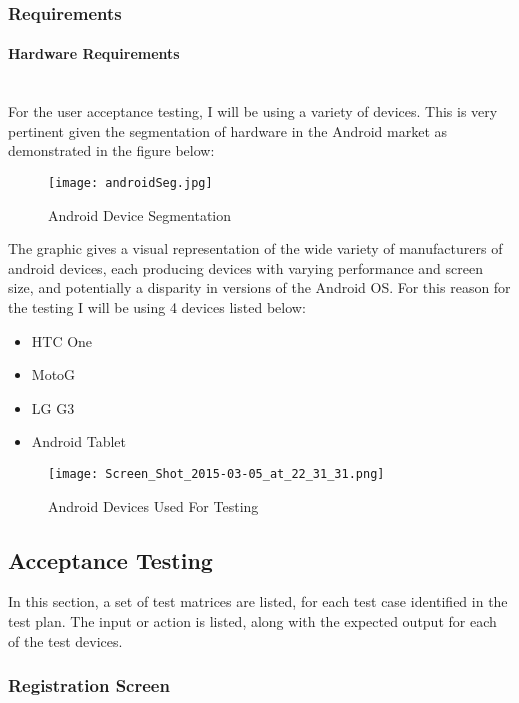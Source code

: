 \documentclass[a4paper]{article}
\newcommand{\subsubsubsection}[1]{\paragraph{#1}\mbox{}\\}
\begin{document}
\subsubsection{Requirements}
\subsubsubsection{Hardware Requirements}
For the user acceptance testing, I will be using a variety of devices. This is very pertinent given the segmentation of hardware in the Android market as demonstrated in the figure below:
\begin{figure}[H]

\centering
\texttt{[image: androidSeg.jpg]}
\caption{Android Device Segmentation}
\end{figure}
The graphic gives a visual representation of the wide variety of manufacturers of android devices, each producing devices with varying performance and screen size, and potentially a disparity in versions of the Android OS.
For this reason for the testing I will be using 4 devices listed below:
\begin{itemize}
\item HTC One
\item MotoG
\item LG G3
\item Android Tablet
\end{itemize}
\begin{figure}[H]

\centering
\texttt{[image: Screen\_Shot\_2015-03-05\_at\_22\_31\_31.png]}
\caption{Android Devices Used For Testing}
\end{figure}





\subsection{Acceptance Testing}
In this section, a set of test matrices are listed, for each test case identified in the test plan. The input or action is listed, along with the expected output for each of the test devices.

\subsubsection{Registration Screen}

\begin{center}
\end{center}
\end{document}
